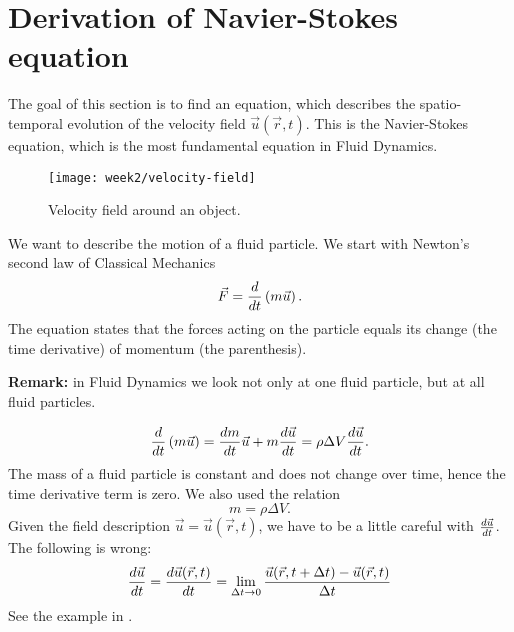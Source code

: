 \section{Derivation of Navier-Stokes equation}
The goal of this section is to find an equation, which describes the spatio-temporal evolution of the velocity field $\vec{u}(\vec{r},t)$. This is the Navier-Stokes equation, which is the most fundamental equation in Fluid Dynamics.
\begin{figure}[!h]
    \centering
    \texttt{[image: week2/velocity-field]}
    \caption{Velocity field around an object.}
    \label{fig:velocity-field}
\end{figure}

We want to describe the motion of a fluid particle. We start with Newton's second law of Classical Mechanics
\begin{equation}
\vec{F} = \frac{d }{d t}\left(m\vec{u}\right).
\end{equation}
The equation states that the forces acting on the particle equals its change (the time derivative) of momentum (the parenthesis).
\begin{framed}
\textbf{Remark:} in Fluid Dynamics we look not only at one fluid particle, but at all fluid particles.
\end{framed}
\begin{equation}
\frac{d }{d t}\left(m\vec{u}\right) = \frac{d m}{d t}\vec{u}+m\frac{d \vec{u}}{d t}=\rho\Delta V\frac{d \vec{u}}{d t}.
\end{equation}
The mass of a fluid particle is constant and does not change over time, hence the time derivative term is zero. We also used the relation
\begin{equation}
m=\rho\Delta V.
\end{equation}
Given the field description $\vec{u}=\vec{u}(\vec{r},t)$, we have to be a little careful with $\frac{d \vec{u}}{d t}$. The following is wrong:
\begin{equation}
\frac{d \vec{u}}{d t} = \frac{d \vec{u}(\vec{r},t)}{d t} = \lim_{\Delta t \rightarrow 0} \frac{\vec{u}(\vec{r},t+\Delta t) - \vec{u}(\vec{r},t)}{\Delta t}
\end{equation}
See the example in .

